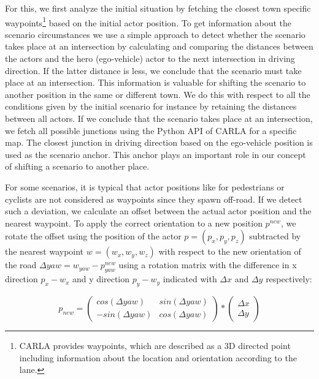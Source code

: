 \documentclass[conference, a4paper, 11pt]{IEEEtran}
\begin{document}
	For this, we first analyze the initial situation by fetching the closest town specific waypoints\footnote{CARLA provides waypoints, which are described as a 3D directed point including information about the location and orientation according to the lane. } based on the initial actor position. To get information about the scenario circumstances we use a simple approach to detect whether the scenario takes place at an intersection by calculating and comparing the distances between the actors and the hero (ego-vehicle) actor to the next intersection in driving direction. If the latter distance is less, we conclude that the scenario must take place at an intersection. This information is valuable for shifting the scenario to another  position in the same or different town. We do this with respect to all the conditions given by the initial scenario for instance by retaining the distances between all actors.
	If we conclude that the scenario takes place at an intersection, we fetch all possible junctions using the Python API of CARLA for a specific map. The closest junction in driving direction based on the ego-vehicle position is used  as the scenario anchor. This anchor plays an important role in our concept of shifting a scenario to another place.
	
	For some scenarios, it is typical that actor positions like for pedestrians or cyclists are not considered as waypoints since they spawn off-road.  If we detect such a deviation, we calculate an offset between the actual actor position and the nearest waypoint. To apply the correct orientation to a new position $p^{new}$, we rotate the offset using the position of the actor $p = (p_x,p_y,p_z)$ subtracted by the nearest waypoint $w = (w_x, w_y, w_z)$ with respect to the new orientation of the road $\Delta yaw = w_{yaw} - p^{new}_{yaw}$  using a rotation matrix with the difference in x direction $p_x - w_x$ and y direction $p_y - w_y$ indicated with $\Delta x$ and $\Delta y$ respectively:
	
	\begin{equation}
	p_{new} = \left(\begin{matrix} cos(\Delta yaw) & sin(\Delta yaw) \\ - sin(\Delta yaw) & cos(\Delta yaw) \end{matrix}\right) *  \left(\begin{matrix} \Delta x \\ \Delta y \end{matrix}\right) 
	\end{equation}
	
\end{document}
